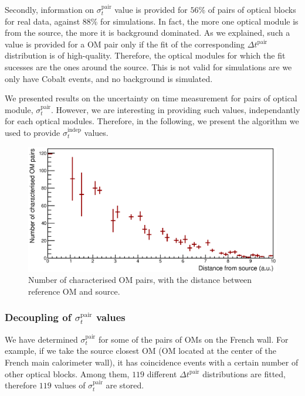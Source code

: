 Secondly, information on $\sigma_{t}^{\text{pair}}$ value is provided for $56$\% of pairs of optical blocks for real data, against $88$\% for simulations.
In fact, the more one optical module is from the source, the more it is background dominated.
As we explained, such a value is provided for a OM pair only if the fit of the corresponding $\Delta t^{\text{pair}}$ distribution is of high-quality.
Therefore, the optical modules for which the fit sucesses are the ones around the source.
This is not valid for simulations are we only have Cobalt events, and no background is simulated.
\newline

We presented results on the uncertainty on time measurement for pairs of optical module, $\sigma_{t}^{\text{pair}}$.
However, we are interesting in providing such values, independantly for each optical modules.
Therefore, in the following, we present the algorithm we used to provide $\sigma_{t}^{\text{indep}}$ values.


\begin{figure}[h]
  \centering
  \includegraphics[width=15cm]{commissioning/fig_commissioning/Co_sigma_distance.eps}
  \caption{Number of characterised OM pairs, with the distance between reference OM and source.
    \label{fig:Co_sigma_distance}}
\end{figure}



\subsubsection*{Decoupling of $\sigma_{t}^{\text{pair}}$ values}

We have determined $\sigma_{t}^{\text{pair}}$ for some of the pairs of OMs on the French wall.
For example, if we take the source closest OM (OM located at the center of the French main calorimeter wall), it has coincidence events with a certain number of other optical blocks.
Among them, $119$ different $\Delta t^{\text{pair}}$ distributions are fitted, therefore $119$ values of $\sigma_{t}^{\text{pair}}$ are stored.






